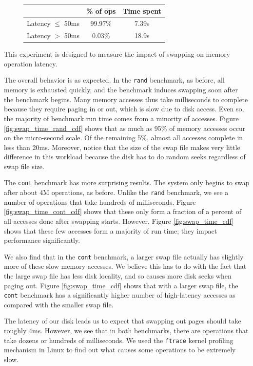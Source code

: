 \documentclass[twocolumn,11pt]{article}
\begin{document}
\begin{figure}[t]
    \centering
    \begin{tabular}{c||c|c}
        & \% of ops & Time spent \\ \hline \hline
        Latency $\le$ 50ms & 99.97\% & 7.39s \\
        Latency $>$ 50ms & 0.03\% & 18.9s \\
    \end{tabular}
\end{figure}

This experiment is designed to measure the impact of swapping on memory
operation latency.

The overall behavior is as expected. In the \texttt{rand} benchmark, as before, all
memory is exhausted quickly, and the benchmark induces swapping soon after the
benchmark begins. Many memory accesses thus take milliseconds to complete
because they require paging in or out, which is slow due to disk access.
Even so, the majority of benchmark run time comes from a minority of accesses.
Figure \ref{fig:swap_time_rand_cdf} shows that as much as 95\% of memory
accesses occur on the micro-second scale. Of the remaining 5\%, almost all
accesses complete in less than 20ms. Moreover, notice that the size of the
swap file makes very little difference in this workload because the disk has to
do random seeks regardless of swap file size.

The \texttt{cont} benchmark has more surprising results.
The system only begins to
swap after about 4M operations, as before. Unlike the \texttt{rand} benchmark, we see a
number of operations that take hundreds of milliseconds. Figure
\ref{fig:swap_time_cont_cdf} shows that these only form a fraction of a percent
of all accesses done after swapping starts. However, Figure
\ref{fig:swap_time_cdf} shows that these few accesses form a majority of run
time; they impact performance significantly.

We also find that in the \texttt{cont} benchmark, a larger swap file actually has
slightly more of these slow memory accesses. We believe this has to do with the
fact that the large swap file has less disk locality, and so causes more disk
seeks when paging out. Figure \ref{fig:swap_time_cdf} shows that with a larger
swap file, the \texttt{cont} benchmark has a significantly higher number of
high-latency accesses as compared with the smaller swap file.

The latency of our disk leads us to expect that swapping out pages should take
roughly 4ms. However, we see that in both benchmarks, there are operations that
take dozens or hundreds of milliseconds. We used the \texttt{ftrace} kernel
profiling mechanism in Linux to find out what causes some operations to be
extremely slow.
\end{document}

